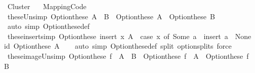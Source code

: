 %
\begin{isabellebody}%
%
%
\isadelimtheory
%
\endisadelimtheory
%
\isatagtheory
{}\isamarkupfalse%
\ Cluster\isanewline
\ \ \ Mapping{\isacharunderscore}{\kern0pt}Code\isanewline
{}%
\endisatagtheory
{\isafoldtheory}%
%
\isadelimtheory
\isanewline
%
\endisadelimtheory
\isanewline
{}\isamarkupfalse%
\ these{\isacharunderscore}{\kern0pt}Un{\isacharbrackleft}{\kern0pt}simp{\isacharbrackright}{\kern0pt}{\isacharcolon}{\kern0pt}\ {\isachardoublequoteopen}Option{\isachardot}{\kern0pt}these\ {\isacharparenleft}{\kern0pt}A\ {\isasymunion}\ B{\isacharparenright}{\kern0pt}\ {\isacharequal}{\kern0pt}\ Option{\isachardot}{\kern0pt}these\ A\ {\isasymunion}\ Option{\isachardot}{\kern0pt}these\ B{\isachardoublequoteclose}\isanewline
%
\isadelimproof
\ \ %
\endisadelimproof
%
\isatagproof
{}\isamarkupfalse%
\ {\isacharparenleft}{\kern0pt}auto\ simp{\isacharcolon}{\kern0pt}\ Option{\isachardot}{\kern0pt}these{\isacharunderscore}{\kern0pt}def{\isacharparenright}{\kern0pt}%
\endisatagproof
{\isafoldproof}%
%
\isadelimproof
\isanewline
%
\endisadelimproof
\isanewline
{}\isamarkupfalse%
\ these{\isacharunderscore}{\kern0pt}insert{\isacharbrackleft}{\kern0pt}simp{\isacharbrackright}{\kern0pt}{\isacharcolon}{\kern0pt}\ {\isachardoublequoteopen}Option{\isachardot}{\kern0pt}these\ {\isacharparenleft}{\kern0pt}insert\ x\ A{\isacharparenright}{\kern0pt}\ {\isacharequal}{\kern0pt}\ {\isacharparenleft}{\kern0pt}case\ x\ of\ Some\ a\ {\isasymRightarrow}\ insert\ a\ {\isacharbar}{\kern0pt}\ None\ {\isasymRightarrow}\ id{\isacharparenright}{\kern0pt}\ {\isacharparenleft}{\kern0pt}Option{\isachardot}{\kern0pt}these\ A{\isacharparenright}{\kern0pt}{\isachardoublequoteclose}\isanewline
%
\isadelimproof
\ \ %
\endisadelimproof
%
\isatagproof
{}\isamarkupfalse%
\ {\isacharparenleft}{\kern0pt}auto\ simp{\isacharcolon}{\kern0pt}\ Option{\isachardot}{\kern0pt}these{\isacharunderscore}{\kern0pt}def\ split{\isacharcolon}{\kern0pt}\ option{\isachardot}{\kern0pt}splits{\isacharparenright}{\kern0pt}\ force%
\endisatagproof
{\isafoldproof}%
%
\isadelimproof
\isanewline
%
\endisadelimproof
\isanewline
{}\isamarkupfalse%
\ these{\isacharunderscore}{\kern0pt}image{\isacharunderscore}{\kern0pt}Un{\isacharbrackleft}{\kern0pt}simp{\isacharbrackright}{\kern0pt}{\isacharcolon}{\kern0pt}\ {\isachardoublequoteopen}Option{\isachardot}{\kern0pt}these\ {\isacharparenleft}{\kern0pt}f\ {\isacharbackquote}{\kern0pt}\ {\isacharparenleft}{\kern0pt}A\ {\isasymunion}\ B{\isacharparenright}{\kern0pt}{\isacharparenright}{\kern0pt}\ {\isacharequal}{\kern0pt}\ Option{\isachardot}{\kern0pt}these\ {\isacharparenleft}{\kern0pt}f\ {\isacharbackquote}{\kern0pt}\ A{\isacharparenright}{\kern0pt}\ {\isasymunion}\ Option{\isachardot}{\kern0pt}these\ {\isacharparenleft}{\kern0pt}f\ {\isacharbackquote}{\kern0pt}\ B{\isacharparenright}{\kern0pt}{\isachardoublequoteclose}\isanewline

\end{isabellebody}
